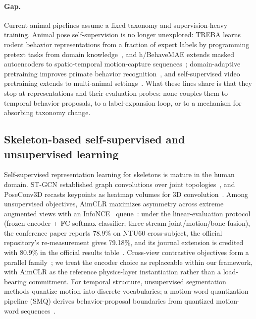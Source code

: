\paragraph{Gap.}
Current animal pipelines assume a fixed taxonomy and supervision-heavy training. Animal pose self-supervision is no longer unexplored: TREBA learns rodent behavior representations from a fraction of expert labels by programming pretext tasks from domain knowledge~\citep{sun2021treba}, and h/BehaveMAE extends masked autoencoders to spatio-temporal motion-capture sequences~\citep{stoffl2024behavemae}; domain-adaptive pretraining improves primate behavior recognition~\citep{primateda2025}, and self-supervised video pretraining extends to multi-animal settings~\citep{mabe22,beast2025}. What these lines share is that they stop at representations and their evaluation probes: none couples them to temporal behavior proposals, to a label-expansion loop, or to a mechanism for absorbing taxonomy change.

\subsection{Skeleton-based self-supervised and unsupervised learning}\label{ssec:rw-ssl}

Self-supervised representation learning for skeletons is mature in the human domain. ST-GCN established graph convolutions over joint topologies~\citep{yan2018stgcn}, and PoseConv3D recasts keypoints as heatmap volumes for 3D convolution~\citep{duan2022posec3d}. Among unsupervised objectives, AimCLR maximizes asymmetry across extreme augmented views with an InfoNCE~\citep{vandenoord2018representation} queue~\citep{guo2022aimclr}: under the linear-evaluation protocol (frozen encoder + FC-softmax classifier; three-stream joint/motion/bone fusion), the conference paper reports 78.9\% on NTU60 cross-subject, the official repository's re-measurement gives 79.18\%, and its journal extension is credited with 80.9\% in the official results table~\citep{aimclrpp2024}. Cross-view contrastive objectives form a parallel family~\citep{li2021crossclr}; we treat the encoder choice as replaceable within our framework, with AimCLR as the reference physics-layer instantiation rather than a load-bearing commitment. For temporal structure, unsupervised segmentation methods quantize motion into discrete vocabularies; a motion-word quantization pipeline (SMQ) derives behavior-proposal boundaries from quantized motion-word sequences~\citep{gokay2025smq}.

